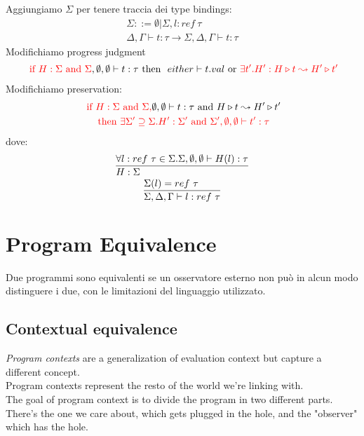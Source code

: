 \documentclass{article}
\begin{document}
Aggiungiamo $\Sigma$ per tenere traccia dei type bindings:
\begin{gather*}
    \Sigma ::= \emptyset | \Sigma,l:ref\ \tau \\
    \Delta,\Gamma\vdash t:\tau \to \Sigma,\Delta,\Gamma \vdash t:\tau
\end{gather*}
Modifichiamo progress judgment
\begin{gather*}
    \textcolor{red}{\text{ if } H:\Sigma\text{ and } \Sigma},\emptyset,\emptyset\vdash t:\tau\text{ then }\ either \vdash t.val\text{ or } \textcolor{red}{\exists t'.H':H\triangleright t\leadsto H'\triangleright t'}
\end{gather*}
Modifichiamo preservation:
\begin{multline*}
    \textcolor{red}{\text{ if } H:\Sigma \text{ and } \Sigma,}\emptyset,\emptyset\vdash t:\tau \text{ and } H\triangleright t\leadsto H'\triangleright t' \\ \textcolor{red}{\text{ then } \exists\Sigma'\supseteq \Sigma. H':\Sigma'\text{ and } \Sigma',\emptyset,\emptyset\vdash t':\tau}
\end{multline*}
dove:
\begin{gather*}
    \st[]{
        H:\Sigma
    }{
        \forall l:ref\ \tau\in\Sigma. \Sigma,\emptyset,\emptyset\vdash H(l):\tau
    } \\
    \st[]{
        \Sigma,\Delta,\Gamma\vdash l:ref\ \tau
    }{
        \Sigma(l)=ref\ \tau
    }
\end{gather*}

\section{Program Equivalence}
Due programmi sono equivalenti se un osservatore esterno non può in alcun modo distinguere i due, con le limitazioni del linguaggio utilizzato.

\subsection{Contextual equivalence}
\textit{Program contexts} are a generalization of evaluation context but capture a different concept.\\
Program contexts represent the resto of the world we're linking with.\\
The goal of program context is to divide the program in two different parts. There's the one we care about, which gets plugged in the hole, and the "observer" which has the hole.
\end{document}
